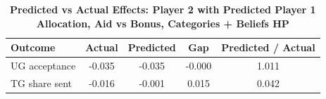 \begin{table}[!htbp]
\centering
\caption{\textbf{Predicted vs Actual Effects: Player 2 with Predicted Player 1 Allocation, Aid vs Bonus, Categories + Beliefs HP}}
\label{tab:cats_hp_aid_vs_bonus_predsender_fullpooled_p2_fit}
\begin{tabular}{lcccc}
\toprule
Outcome & Actual & Predicted & Gap & Predicted / Actual \\
\midrule
UG acceptance & -0.035 & -0.035 & -0.000 & 1.011 \\
TG share sent & -0.016 & -0.001 & 0.015 & 0.042 \\
\bottomrule
\end{tabular}
\end{table}

